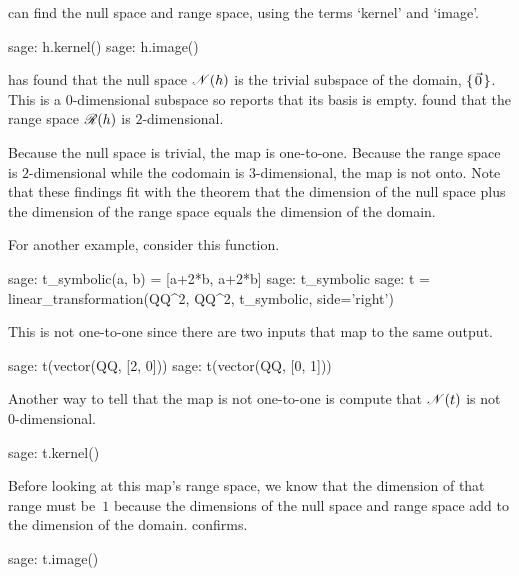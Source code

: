 \Sage{} can find the null space 
and range space, using the 
terms `kernel' and `image'.
\begin{sagecommandline}
sage: h.kernel()                                       
sage: h.image()                                        
\end{sagecommandline}
\Sage{} has found that 
the null space $\mathscr{N}(h)$ is the trivial subspace of the domain,
$\mbox{$\{\hspace{0.1em}\vec{0}\hspace{0.1em}\}$}$.
This is a $0$-dimensional
subspace so \Sage{} reports that its basis is empty.
\Sage{} found that the range space $\mathscr{R}(h)$ is $2$-dimensional. 

Because the null space is trivial, the map is one-to-one. 
Because the range space is $2$-dimensional while 
the codomain is $3$-dimensional, the map is not onto.
Note that these findings fit with the theorem that
the dimension of the null space plus the dimension of the 
range space equals the dimension of the domain.

For another example, consider this function.
\begin{sagecommandline}
sage: t_symbolic(a, b) = [a+2*b, a+2*b]
sage: t_symbolic
sage: t = linear_transformation(QQ^2, QQ^2, t_symbolic, side='right')
\end{sagecommandline}
This is not one-to-one since there are two inputs
that map to the same output.  
\begin{sagecommandline}
sage: t(vector(QQ, [2, 0]))
sage: t(vector(QQ, [0, 1]))
\end{sagecommandline}
\noindent
Another way to tell that the map is not one-to-one is compute that 
$\mathscr{N}(t)$ is not $0$-dimensional.
\begin{sagecommandline}
sage: t.kernel()
\end{sagecommandline}

Before looking at this map's range space, 
we know that the dimension of that range must be~$1$ 
because the dimensions of the null space and
range space add to the dimension of the domain.
\Sage{} confirms.
\begin{sagecommandline}
sage: t.image()
\end{sagecommandline}



